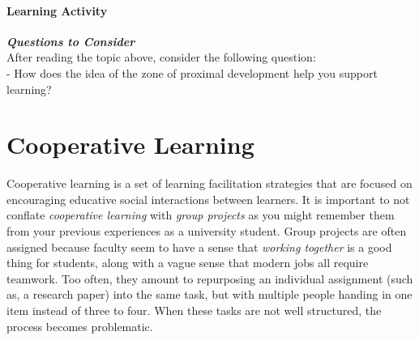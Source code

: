 \documentclass[
]{book}
\begin{document}
\begin{reflect}
\hypertarget{learning-activity}{%
\paragraph{Learning Activity}\label{learning-activity}}

\textbf{\emph{Questions to Consider}}\\
After reading the topic above, consider the following question:\\
- How does the idea of the zone of proximal development help you support
learning?
\end{reflect}

\hypertarget{cooperative-learning}{%
\section{Cooperative Learning}\label{cooperative-learning}}

Cooperative learning is a set of learning facilitation strategies that are focused on encouraging educative social interactions between learners. It is important to not conflate \emph{cooperative learning} with \emph{group projects} as you might remember them from your previous experiences as a university student. Group projects are often assigned because faculty seem to have a sense that \emph{working together} is a good thing for students, along with a vague sense that modern jobs all require teamwork. Too often, they amount to repurposing an individual assignment (such as, a research paper) into the same task, but with multiple people handing in one item instead of three to four. When these tasks are not well structured, the process becomes problematic.
\end{document}
